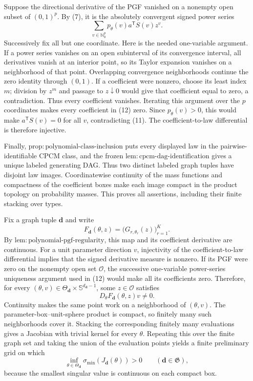 Suppose the directional derivative of the PGF vanished on a nonempty open subset of \((0,1)^p\).  By (7), it is the absolutely convergent signed power series
\[
 \sum_{v\in\mathbb N_0^p}p_\theta(v)a^{\mathsf T}S(v)z^v. \tag{12}
\]
Successively fix all but one coordinate.  Here is the needed one-variable argument.  If a power series vanishes on an open subinterval of its convergence interval, all derivatives vanish at an interior point, so its Taylor expansion vanishes on a neighborhood of that point.  Overlapping convergence neighborhoods continue the zero identity through \((0,1)\).  If a coefficient were nonzero, choose its least index \(m\); division by \(z^m\) and passage to \(z\downarrow0\) would give that coefficient equal to zero, a contradiction.  Thus every coefficient vanishes.  Iterating this argument over the \(p\) coordinates makes every coefficient in (12) zero.  Since \(p_\theta(v)>0\), this would make \(a^{\mathsf T}S(v)=0\) for all \(v\), contradicting (11).  The coefficient-to-law differential is therefore injective.

Finally, \(\mathrm{prop{:}polynomial\text{-}class\text{-}inclusion}\) puts every displayed law in the pairwise-identifiable CPCM class, and the frozen \(\mathrm{lem{:}cpcm\text{-}dag\text{-}identification}\) gives a unique labeled generating DAG.  Thus two distinct labeled graph tuples have disjoint law images.  Coordinatewise continuity of the mass functions and compactness of the coefficient boxes make each image compact in the product topology on probability masses.  This proves all assertions, including their finite stacking over types.

Fix a graph tuple \(\boldsymbol d\) and write
\[
 F_{\boldsymbol d}(\theta,z)
 =\bigl(G_{r,\theta_r}(z)\bigr)_{r=1}^{K}.
\]
By \(\mathrm{lem{:}polynomial\text{-}pgf\text{-}regularity}\), this map and its coefficient derivative are continuous.  For a unit parameter direction \(v\), injectivity of the coefficient-to-law differential implies that the signed derivative measure is nonzero.  If its PGF were zero on the nonempty open set \(\mathcal O\), the successive one-variable power-series uniqueness argument used in (12) would make all its coefficients zero.  Therefore, for every \((\theta,v)\in\Theta_{\boldsymbol d}\times\mathbb S^{d_{\boldsymbol d}-1}\), some \(z\in\mathcal O\) satisfies
\[
 D_\theta F_{\boldsymbol d}(\theta,z)v\ne0. \tag{13}
\]
Continuity makes the same point work on a neighborhood of \((\theta,v)\).  The parameter-box--unit-sphere product is compact, so finitely many such neighborhoods cover it.  Stacking the corresponding finitely many evaluations gives a Jacobian with trivial kernel for every \(\theta\).  Repeating this over the finite graph set and taking the union of the evaluation points yields a finite preliminary grid on which
\[
 \inf_{\theta\in\Theta_{\boldsymbol d}}
 \sigma_{\min}(J_{\boldsymbol d}(\theta))>0
 \qquad(\boldsymbol d\in\mathfrak G), \tag{14}
\]
because the smallest singular value is continuous on each compact box.

